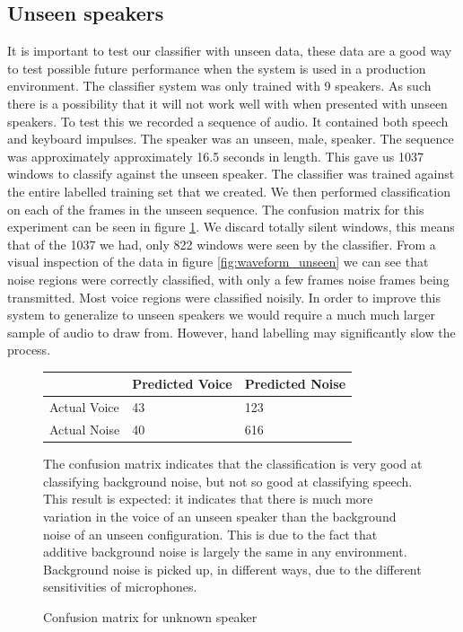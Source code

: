 \documentclass[ %
                    author={Sam Phippen},
                supervisor={Dr. Rafal Bogacz},
                     title={Real time voice activity detectors in noisy personal computing environments},
                  subtitle={},
                    degree={MEng},
                      year={2012} ]{thesis}
\begin{document}
\subsection{Unseen speakers}

It is important to test our classifier with unseen data, these data are a good
way to test possible future performance when the system is used in a production
environment. The classifier system was only trained with 9 speakers. As such
there is a possibility that it will not work well with when presented with
unseen speakers. To test this we recorded a sequence of audio. It contained
both speech and keyboard impulses. The speaker was an unseen, male, speaker.
The sequence was approximately approximately 16.5 seconds in length. This gave
us 1037 windows to classify against the unseen speaker. The classifier was
trained against the entire labelled training set that we created. We then
performed classification on each of the frames in the unseen sequence. The
confusion matrix for this experiment can be seen in figure
\ref{table:confusion_unseen}. We discard totally silent windows, this means
that of the 1037 we had, only 822 windows were seen by the classifier. From a
visual inspection of the data in figure \ref{fig:waveform_unseen} we can see
that noise regions were correctly classified, with only a few frames noise
frames being transmitted. Most voice regions were classified noisily. In order
to improve this system to generalize to unseen speakers we would require a much
much larger sample of audio to draw from. However, hand labelling may
significantly slow the process.


\begin{figure}
    \begin{center}
        \begin{tabular}{| l | l | l |}
            \hline
                         & Predicted Voice & Predicted Noise \\ \hline
            Actual Voice & 43              & 123 \\
            Actual Noise & 40              & 616 \\ \hline
        \end{tabular}
    \end{center}
    \vspace{\baselineskip}

    The confusion matrix indicates that the classification is very good at
    classifying background noise, but not so good at classifying speech. This
    result is expected: it indicates that there is much more variation in the
    voice of an unseen speaker than the background noise of an unseen
    configuration. This is due to the fact that additive background noise is
    largely the same in any environment. Background noise is picked up, in
    different ways, due to the different sensitivities of microphones.

    \caption{Confusion matrix for unknown speaker}
    \label{table:confusion_unseen}
\end{figure}
\end{document}
